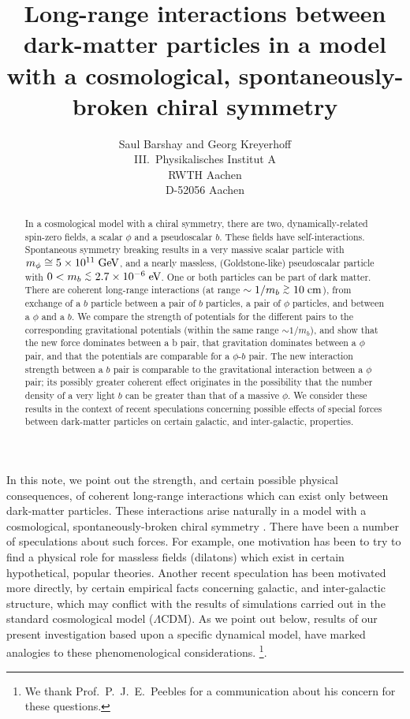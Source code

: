 \title{Long-range interactions between dark-matter particles in a model with a cosmological,
spontaneously-broken chiral symmetry
}
\author{Saul Barshay and Georg Kreyerhoff\\
III.~Physikalisches Institut A\\
RWTH Aachen\\
D-52056 Aachen}
\maketitle
\begin{abstract}
In a cosmological model with a chiral symmetry, there are two, dynamically-related spin-zero fields,
a scalar $\phi$ and a pseudoscalar $b$. These fields have self-interactions. Spontaneous symmetry breaking
results in a very massive scalar particle with $m_\phi\cong 5 \times 10^{11}\;\mbox{GeV}$, and a nearly massless, (Goldstone-like)
pseudoscalar particle with $0< m_b \stackrel{<}{{}_\sim} 2.7\times 10^{-6}\;\mbox{eV}$. One or both particles can be part of dark matter.
There are coherent long-range interactions (at range $\sim 1/m_b \stackrel{>}{{}_\sim} 10\;\mbox{cm}$), from exchange of a $b$ particle 
between a pair of $b$ particles, a pair of $\phi$ particles, and between a $\phi$ and a $b$. We compare the strength
of potentials for the different pairs to the corresponding gravitational potentials (within the same range $\sim 1/m_b$), and
show that the new force dominates between a b pair, that gravitation dominates between a $\phi$ pair, and that the
potentials are comparable for a $\phi$-$b$ pair. The new interaction strength between a $b$ pair is comparable
to the gravitational interaction between a $\phi$ pair; its possibly greater coherent effect originates in the
possibility that the number density of a very light $b$ can be greater than that of a massive $\phi$.
We consider these results in the context of recent speculations concerning possible effects of special
forces between dark-matter particles on certain galactic, and inter-galactic, properties.
\end{abstract}
In this note, we point out the strength, and certain possible physical consequences, of coherent long-range interactions
which can exist only between dark-matter particles. These interactions arise naturally in a model with a 
cosmological, spontaneously-broken chiral symmetry \cite{ref1,ref2}. There have been a number of speculations
about such forces. For example, one motivation \cite{ref3} has been to try to find a physical role for 
massless fields (dilatons) which exist in certain hypothetical, popular theories. Another recent speculation
has been motivated \cite{ref4} more directly, by certain empirical facts concerning galactic, and inter-galactic
structure, which may conflict with the results of simulations carried out in the standard cosmological model
($\Lambda$CDM). As we point out below, results of our present investigation based upon a specific dynamical
model, have  marked analogies to these phenomenological considerations. \cite{ref4}\footnote{
We thank Prof.~P.~J.~E.~Peebles for a communication about his concern for these questions.
}.

